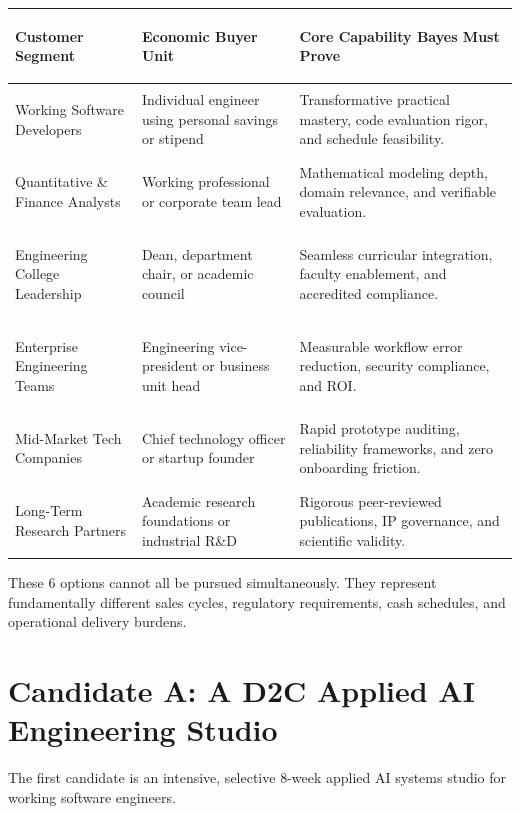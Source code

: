 \begin{tcolorbox}[
  enhanced,
  colback=BayesSurface!60,
  colframe=BayesBorder,
  boxrule=0.5pt,
  arc=3pt,
  left=3pt,right=3pt,top=3pt,bottom=3pt,
  boxsep=1pt
]
\scriptsize
\begin{tabularx}{\linewidth}{>{\bfseries\raggedright\arraybackslash}p{2.3cm} >{\raggedright\arraybackslash}p{2.2cm} X}
\toprule
\textbf{Customer Segment} & \textbf{Economic Buyer Unit} & \textbf{Core Capability Bayes Must Prove} \\
\midrule
Working Software Developers & Individual engineer using personal savings or stipend & Transformative practical mastery, code evaluation rigor, and schedule feasibility. \\
\addlinespace[2pt]
Quantitative \& Finance Analysts & Working professional or corporate team lead & Mathematical modeling depth, domain relevance, and verifiable evaluation. \\
\addlinespace[2pt]
Engineering College Leadership & Dean, department chair, or academic council & Seamless curricular integration, faculty enablement, and accredited compliance. \\
\addlinespace[2pt]
Enterprise Engineering Teams & Engineering vice-president or business unit head & Measurable workflow error reduction, security compliance, and ROI. \\
\addlinespace[2pt]
Mid-Market Tech Companies & Chief technology officer or startup founder & Rapid prototype auditing, reliability frameworks, and zero onboarding friction. \\
\addlinespace[2pt]
Long-Term Research Partners & Academic research foundations or industrial R\&D & Rigorous peer-reviewed publications, IP governance, and scientific validity. \\
\bottomrule
\end{tabularx}
\end{tcolorbox}

These 6 options cannot all be pursued simultaneously. They represent fundamentally different sales cycles, regulatory requirements, cash schedules, and operational delivery burdens.

\section{Candidate A: A D2C Applied AI Engineering Studio}

The first candidate is an intensive, selective 8-week applied AI systems studio for working software engineers.

